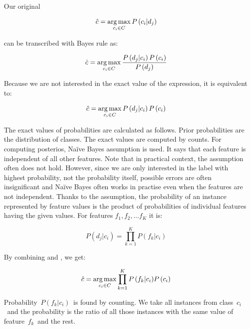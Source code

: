 Our original 

\begin{equation}
	\hat{c} = \operatorname*{arg\,max}_{c_i \in C} P\left(c_i  | d_j \right)
\end{equation}

can be transcribed with Bayes rule as:

\begin{equation}
	\hat{c} = \operatorname*{arg\,max}_{c_i \in C}
	\frac{
	P\left(d_j  | c_i \right)
	P\left( c_i \right)
}{
	P\left( d_j \right)
}
\end{equation}

Because we are not interested in the exact value of the expression, it is equivalent to:

\begin{equation}
	\label{eq:classprb}
	\hat{c} = \operatorname*{arg\,max}_{c_i \in C}
	P\left(d_j  | c_i \right)
	P\left( c_i \right)
\end{equation}

The exact values of probabilities are calculated as follows.
Prior probabilities are the distribution of classes.
The exact values are computed by counts.
For computing posterios, Na\"{i}ve Bayes assumption is used.
It says that each feature is independent of all other features.
Note that in practical context, the assumption often does not hold.
However, since we are only interested in the label with highest probability,
not the probability itself, possible errors are often insignificant and Na\"{i}ve Bayes often works in practise even when the features are not independent.
Thanks to the assumption, the probability of an instance represented by feature values is the product
of probabilities of individual features having the given values.
For features $f_1, f_2, \dots f_K$ it is:

\begin{equation}
	\label{eq:posterios}
	P\left(d_j  | c_i \right) = \prod_{k=1}^{K}
	{P\left(  f_k  | c_i \right)}
\end{equation}

By combining  and , we get:

\begin{equation}
	\hat{c} = \operatorname*{arg\,max}_{c_i \in C}
	\prod_{k=1}^{K}
	{P\left(  f_k  | c_i \right)}
	P\left( c_i \right)
\end{equation}

Probability~$P\left(f_k|c_i\right)$~is found by counting.
We take all instances from class~$c_i$~and the probability is the ratio of all those instances with the same value of feature~$f_k$~and the rest.


